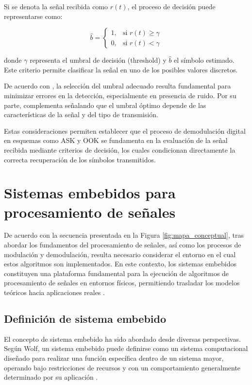 Si se denota la señal recibida como \( r(t) \), el proceso de decisión puede representarse como:

\begin{equation}
\hat{b} =
\begin{cases}
1, & \text{si } r(t) \geq \gamma \\
0, & \text{si } r(t) < \gamma
\end{cases}
\label{eq:decision_threshold}
\end{equation}

donde \( \gamma \) representa el umbral de decisión (threshold) y \( \hat{b} \) el símbolo estimado. Este criterio permite clasificar la señal en uno de los posibles valores discretos.

De acuerdo con \cite{proakis2007digital}, la selección del umbral adecuado resulta fundamental para minimizar errores en la detección, especialmente en presencia de ruido. Por su parte, \cite{haykin2001} complementa señalando que el umbral óptimo depende de las características de la señal y del tipo de transmisión.

Estas consideraciones permiten establecer que el proceso de demodulación digital en esquemas como ASK y OOK se fundamenta en la evaluación de la señal recibida mediante criterios de decisión, los cuales condicionan directamente la correcta recuperación de los símbolos transmitidos.



\section{Sistemas embebidos para procesamiento de señales}

De acuerdo con la secuencia presentada en la Figura \ref{fig:mapa_conceptual}, tras abordar los fundamentos del procesamiento de señales, así como los procesos de modulación y demodulación, resulta necesario considerar el entorno en el cual estos algoritmos son implementados. En este contexto, los sistemas embebidos constituyen una plataforma fundamental para la ejecución de algoritmos de procesamiento de señales en entornos físicos, permitiendo trasladar los modelos teóricos hacia aplicaciones reales \cite{wolf2012computers}.

\subsection{Definición de sistema embebido}

El concepto de sistema embebido ha sido abordado desde diversas perspectivas. Según Wolf, un sistema embebido puede definirse como un sistema computacional diseñado para realizar una función específica dentro de un sistema mayor, operando bajo restricciones de recursos y con un comportamiento generalmente determinado por su aplicación \cite{wolf2012computers}.

